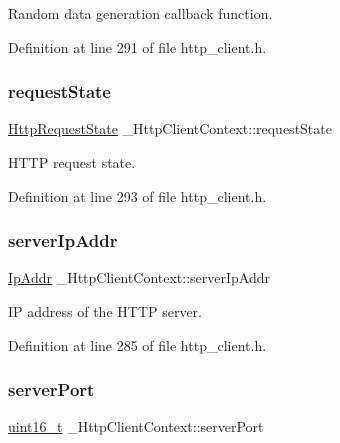 Random data generation callback function. 



Definition at line 291 of file http\+\_\+client.\+h.

\mbox{\label{struct__HttpClientContext_a73bb481876ac7157f0000904a787488b}} 
\subsubsection{\texorpdfstring{request\+State}{requestState}}
{\footnotesize\ttfamily \hyperlink{http__common_8h_a4fe74ac4ac2fba01b65f71b093977671}{Http\+Request\+State} \+\_\+\+Http\+Client\+Context\+::request\+State}



H\+T\+TP request state. 



Definition at line 293 of file http\+\_\+client.\+h.

\mbox{\label{struct__HttpClientContext_a25234fdea69a2f458cc41d7639300f9f}} 
\subsubsection{\texorpdfstring{server\+Ip\+Addr}{serverIpAddr}}
{\footnotesize\ttfamily \hyperlink{structIpAddr}{Ip\+Addr} \+\_\+\+Http\+Client\+Context\+::server\+Ip\+Addr}



IP address of the H\+T\+TP server. 



Definition at line 285 of file http\+\_\+client.\+h.

\mbox{\label{struct__HttpClientContext_a04d611c9be165914c456d12880eae695}} 
\subsubsection{\texorpdfstring{server\+Port}{serverPort}}
{\footnotesize\ttfamily \hyperlink{stdint_8h_a273cf69d639a59973b6019625df33e30}{uint16\+\_\+t} \+\_\+\+Http\+Client\+Context\+::server\+Port}



